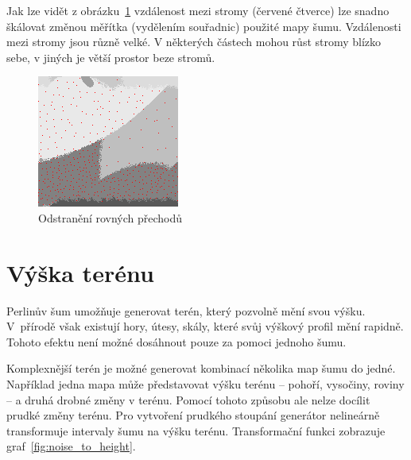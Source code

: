 \documentclass[thesis=M,czech]{FITthesis}[2019/12/23]
\begin{document}
Jak lze vidět z obrázku~\ref{fig:trees} vzdálenost mezi stromy (červené čtverce) lze snadno škálovat změnou měřítka (vydělením souřadnic) použité mapy šumu. Vzdálenosti mezi stromy jsou různě velké. V některých částech mohou růst stromy blízko sebe, v jiných je větší prostor beze stromů.

\begin{figure}\centering
	\includegraphics[width=\textwidth]{images/world_gen/trees}
	\caption[Odstranění rovných přechodů]{Odstranění rovných přechodů}\label{fig:trees}
\end{figure}

\section{Výška terénu}

Perlinův šum umožňuje generovat terén, který pozvolně mění svou výšku. V~přírodě však existují hory, útesy, skály, které svůj výškový profil mění rapidně. Tohoto efektu není možné dosáhnout pouze za pomoci jednoho šumu.

Komplexnější terén je možné generovat kombinací několika map šumu do jedné. Například jedna mapa může představovat výšku terénu – pohoří, vysočiny, roviny – a druhá drobné změny v terénu. Pomocí tohoto způsobu ale nelze docílit prudké změny terénu. Pro vytvoření prudkého stoupání generátor nelineárně transformuje intervaly šumu na výšku terénu. Transformační funkci zobrazuje graf~\ref{fig:noise_to_height}.
\end{document}

